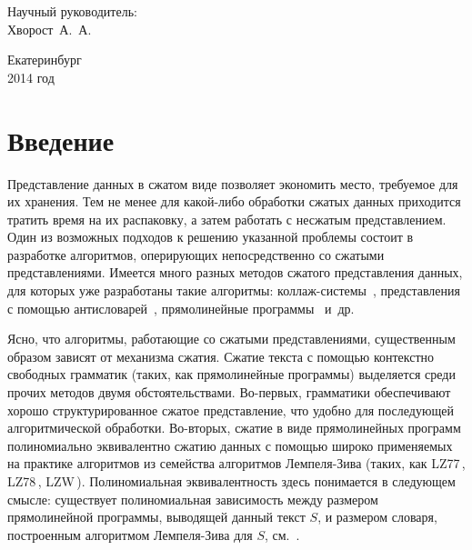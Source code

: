 \documentclass[14pt]{article}
\renewcommand{\normalsize}{\fontsize{14}{18pt}\selectfont}
\begin{document}
{\begin{singlespace}
\begin{minipage}{85mm}
	\vspace{0.5cm}
	
	\begin{flushright}
		\normalsize Научный руководитель:\\
		\normalsize Хворост~А.~А.
	\end{flushright}
\end{minipage}

\vspace{4cm}

\begin{center}
Екатеринбург\\
2014 год
\end{center}

\end{singlespace}
}

\restoregeometry

\newpage

\begin{singlespace}
\normalsize
\tableofcontents
\newpage
\end{singlespace}

\section{Введение}

Представление данных в сжатом виде позволяет экономить место,
требуемое для их хранения. Тем не менее для какой-либо обработки сжатых данных приходится тратить время на их распаковку, а затем
работать с несжатым представлением. Один из возможных подходов к решению указанной проблемы состоит в разработке
алгоритмов, оперирующих непосредственно со сжатыми представлениями. Имеется много разных методов сжатого представления данных,
для которых уже разработаны такие алгоритмы: коллаж-системы~\cite{collages}, представления с помощью антисловарей~\cite{antidictionaries},
прямолинейные программы~\cite{RytterSLPConstruction} и~др.

Ясно, что алгоритмы, работающие со сжатыми представлениями, существенным образом зависят от механизма сжатия. Сжатие текста с помощью
контекстно свободных грамматик (таких, как прямолинейные программы) выделяется среди прочих методов двумя обстоятельствами. Во-первых,
грамматики обеспечивают хорошо структурированное сжатое представление, что удобно для последующей алгоритмической обработки.
Во-вторых, сжатие в виде прямолинейных программ полиномиально эквивалентно сжатию данных с помощью широко применяемых на практике
алгоритмов из семейства алгоритмов Лемпеля-Зива (таких, как LZ77\,\cite{LZ77}, LZ78\,\cite{LZ78}, LZW\,\cite{LZW}).
Полиномиальная эквивалентность здесь понимается в следующем смысле: существует полиномиальная
зависимость между размером прямолинейной программы, выводящей данный текст $S$, и размером словаря,
построенным алгоритмом Лемпеля-Зива для $S$, см.~\cite{RytterSLPConstruction}.
\end{document}
